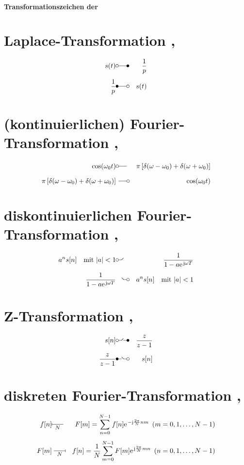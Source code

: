 \documentclass[11pt,a4paper]{article}
\begin{document}
\noindent
\textbf{\LARGE Transformationszeichen der}

\section*{Laplace-Transformation \protect\laplace, \protect\Laplace}
\begin{eqnarray}
  s(t)        &\laplace& \frac{1}{p}\\[1ex]
  \frac{1}{p} &\Laplace& s(t)
\end{eqnarray}

\section*{(kontinuierlichen) Fourier-Transformation\newline
          \protect\fourier, \protect\Fourier}
\begin{eqnarray}
  \cos(\omega_0 t) &\fourier&
  \pi\left[\delta(\omega-\omega_0) +
           \delta(\omega+\omega_0)\right]\\[1ex]
  \pi\left[\delta(\omega-\omega_0) +
  \delta(\omega+\omega_0)\right] &
  \Fourier&
  \cos(\omega_0 t)
\end{eqnarray}

\section*{diskontinuierlichen Fourier-Transformation\newline
          \protect\dfourier, \protect\Dfourier}
\begin{eqnarray}
  a^n s[n]\quad\mbox{mit~}|a| < 1 &\dfourier&
  \frac{1}{1-a \e^{\im\omega T}}\\[1ex]
  \frac{1}{1-a \e^{\im\omega T}}  &\Dfourier&
  a^n s[n]\quad\mbox{mit~}|a| < 1
\end{eqnarray}

\section*{Z-Transformation
          \protect\ztransf, \protect\Ztransf}
\begin{eqnarray}
  s[n]          &\ztransf& \frac{z}{z-1}\\[1ex]
  \frac{z}{z-1} &\Ztransf& s[n]
\end{eqnarray}

\section*{diskreten Fourier-Transformation
          \protect\dft{}, \protect\DFT{}}
\begin{eqnarray}
  f[n] &\dft{N}&
  F[m] = \sum_{n=0}^{N-1} f[n] \e^{-\im\frac{2 \pi}{N}nm}%
  \:\;(m = 0, 1, \ldots, N-1)\\[1ex]
  F[m] &\DFT{N}&
  f[n] = \frac{1}{N}\sum_{m=0}^{N-1} F[m] \e^{\im\frac{2\pi}{N}mn}%
  \:\;(n = 0, 1, \ldots, N-1)
\end{eqnarray}
\end{document}
